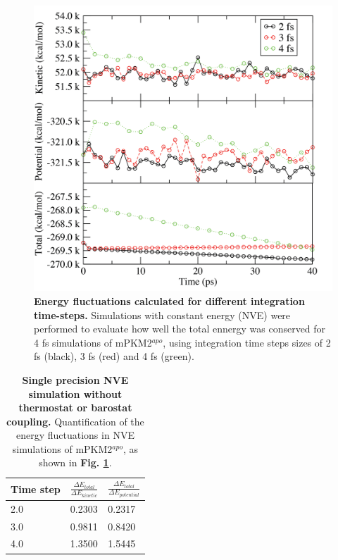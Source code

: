 %
\begin{figure}[!ht]
\includegraphics[scale=0.5]{ch6_fig1_timestep.png}
\caption[Energy fluctuations calculated for different integration time- steps.] {\textbf{Energy fluctuations calculated for different integration time-steps.} Simulations with constant energy (NVE) were performed to evaluate how well the total ennergy was conserved for 4 fs simulations of mPKM2$^{apo}$, using integration time steps sizes of 2 fs (black), 3 fs (red) and 4 fs (green).}
\label{fig:timestep}
\end{figure}
%
%
%
\begin{table}[!ht]
\begin{tabular}{@{}lll@{}}
\toprule
Time step & $\frac{\Delta E_{total}}{\Delta E_{kinetic}}$ & $\frac{\Delta E_{total}}{\Delta E_{potential}}$ \\ \midrule
2.0 & 0.2303 & 0.2317 \\
3.0 & 0.9811 & 0.8420 \\
4.0 & 1.3500 & 1.5445 \\ \bottomrule
\end{tabular}
\caption[Single precision NVE simulation without thermostat or barostat coupling.]{\textbf{Single precision NVE simulation without thermostat or barostat coupling.} Quantification of the energy fluctuations in NVE simulations of mPKM2$^{apo}$, as shown in \textbf{Fig. \ref{fig:timestep}}.}
\label{tab:timestep}
\end{table}
